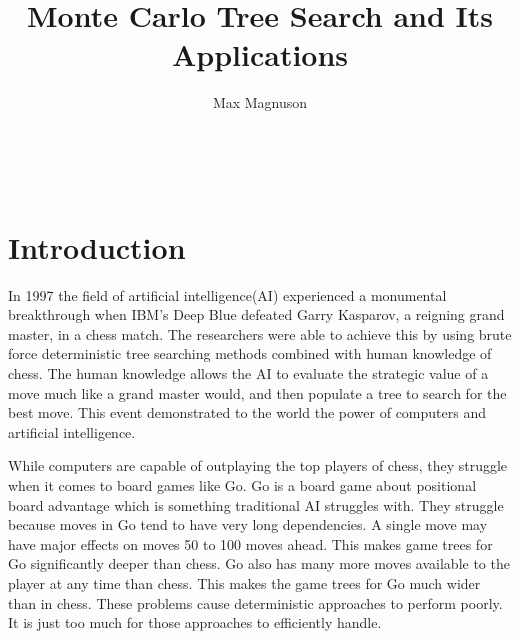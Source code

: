 \documentclass{sig-alternate}
\begin{document}

\title{Monte Carlo Tree Search and Its Applications}


\author{
\alignauthor
Max Magnuson\\
	\\
	\\
	\\
}

\maketitle
\begin{abstract}

\end{abstract}


\section{Introduction} 
In 1997 the field of artificial intelligence(AI) experienced a monumental breakthrough when IBM's Deep Blue defeated Garry Kasparov, a reigning grand master, in a chess match\cite{TheGrandChallenge}. The researchers were able to achieve this by using brute force deterministic tree searching methods combined with human knowledge of chess. The human knowledge allows the AI to evaluate the strategic value of a move much like a grand master would, and then populate a tree to search for the best move. This event demonstrated to the world the power of computers and artificial intelligence. 

While computers are capable of outplaying the top players of chess, they struggle when it comes to board games like Go\cite{TheGrandChallenge}. Go is a board game about positional board advantage which is something traditional AI struggles with. They struggle because moves in Go tend to have very long dependencies. A single move may have major effects on moves 50 to 100 moves ahead\cite{RAVEinGo}. This makes game trees for Go significantly deeper than chess. Go also has many more moves available to the player at any time than chess. This makes the game trees for Go much wider than in chess. These problems cause deterministic approaches to perform poorly. It is just too much for those approaches to efficiently handle.
\end{document}
